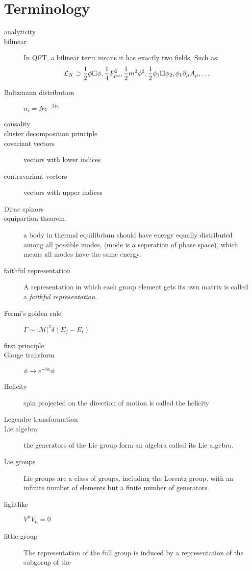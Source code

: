 \chapter{Terminology}
\begin{description}
    \item [analyticity]
    \item [bilinear]	In QFT, a bilinear term means it has exactly two
	fields. Such as:
	\[ \mathcal{L}_K \supset \frac{1}{2}\phi\Box\phi,
	\frac{1}{4}F^2_{\mu\nu}, \frac{1}{2}m^2\phi^2,
	\frac{1}{2}\phi_1\Box\phi_2, \phi_1\partial_\mu A_\mu, \dots \]
    \item [Boltzmann distribution]  $n_{i} = Ne^{-\beta E_{i}}$
    \item [causality]
    \item [cluster decomposition principle]
    \item [covariant vectors]	vectors with lower indices
    \item [contravariant vectors]   vectors with upper indices
    \item [Dirac spinors]
    \item [equipartion theorem] a body in thermal equilibrium should have
	energy equally distributed among all possible modes, (mode is a
	seperation of phase space), which means all modes have the same
	energy.
    \item [faithful representation] A representation in which each group
	element gets its own matrix is called a \emph{faithful
	representation}.
    \item [Fermi's golden rule]	$\Gamma \sim |\mathcal{M}|^{2}\delta(E_f - E_i)$
    \item [first principle]
    \item [Gauge transform] $\phi \rightarrow e^{-i\alpha}\phi$
    \item [Helicity] spin projected on the direction of motion is called the
	helicity
    \item [Legendre transformation]
    \item [Lie algebra] the generators of the Lie group form an algebra
	called its Lie algebra. 
    \item [Lie groups]	Lie groups are a class of groups, including the
	Lorentz group, with an infinite number of elements but a finite
	number of generators.
    \item [lightlike]	$V^\mu V_\mu = 0$
    \item [little group] The representation of the full \Poincare{}
	group is induced by a representation of the subgorup of the

\end{description}
